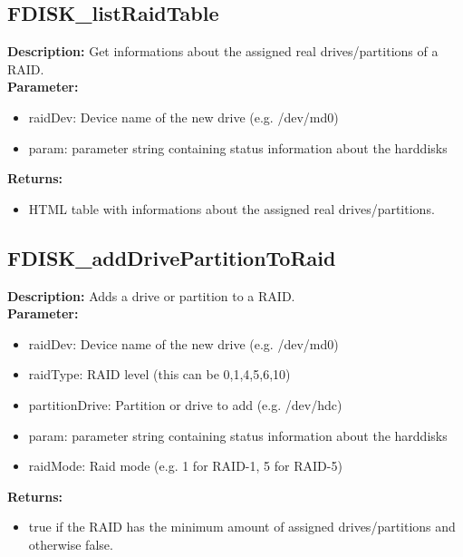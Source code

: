 \subsection{FDISK\_listRaidTable}
\textbf{Description:} Get informations about the assigned real drives/partitions of a RAID.\\
\textbf{Parameter:}
\begin{itemize}
\item raidDev: Device name of the new drive (e.g. /dev/md0)
\item param: parameter string containing status information about the harddisks
\end{itemize}
\textbf{Returns:}
\begin{itemize}
\item HTML table with informations about the assigned real drives/partitions.
\end{itemize}

\subsection{FDISK\_addDrivePartitionToRaid}
\textbf{Description:} Adds a drive or partition to a RAID.\\
\textbf{Parameter:}
\begin{itemize}
\item raidDev: Device name of the new drive (e.g. /dev/md0)
\item raidType: RAID level (this can be 0,1,4,5,6,10)
\item partitionDrive: Partition or drive to add (e.g. /dev/hdc)
\item param: parameter string containing status information about the harddisks
\item raidMode: Raid mode (e.g. 1 for RAID-1, 5 for RAID-5)
\end{itemize}
\textbf{Returns:}
\begin{itemize}
\item true if the RAID has the minimum amount of assigned drives/partitions and otherwise false.
\end{itemize}

